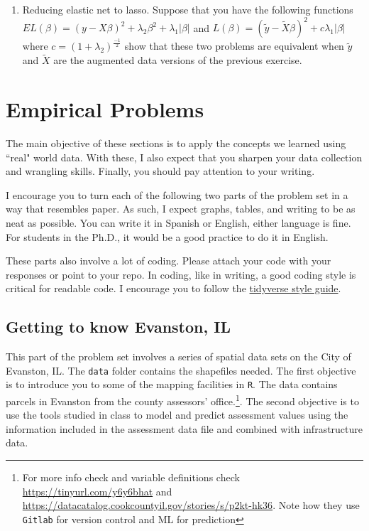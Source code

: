 \documentclass[12pt]{article}
\begin{document}
\begin{enumerate}
  \item Reducing elastic net to lasso. Suppose that you have the following functions $EL(\beta) = (y-X\beta)^2+ \lambda_2 \beta^2+ \lambda_1|\beta|$ and $L(\beta) = (\tilde{y}-\tilde{X}\beta)^2+ c \lambda_1|\beta|$ where $c=(1+\lambda_2)^{\frac{-1}{2}}$ show that these two problems are equivalent when $\tilde{y}$ and $\tilde{X}$ are the augmented data versions of the previous exercise.
\end{enumerate}

\section{Empirical Problems}

The main objective of these sections is to apply the concepts we learned using ``real" world data. With these, I also expect that you sharpen your data collection and wrangling skills. Finally, you should pay attention to your writing.

I encourage you to turn each of the following two parts of the problem set in a way that resembles paper. As such, I expect graphs, tables, and writing to be as neat as possible. You can write it in Spanish or English, either language is fine. For students in the Ph.D., it would be a good practice to do it in English.

These parts also involve a lot of coding. Please attach your code with your responses or point to your repo. In coding, like in writing, a good coding style is critical for readable code. I encourage you to follow the \href{https://style.tidyverse.org/}{tidyverse style guide}.


\subsection{Getting to know Evanston, IL}

This part of the problem set involves a series of spatial data sets on the City of Evanston, IL. The \texttt{data} folder contains the shapefiles needed. The first objective is to introduce you to some of the mapping facilities in \texttt{R}.  The data contains parcels in Evanston from the county assessors' office.\footnote{For more info check and variable definitions check \url{https://tinyurl.com/y6y6bhat} and \url{https://datacatalog.cookcountyil.gov/stories/s/p2kt-hk36}. Note how they use \texttt{Gitlab} for version control and ML for prediction}. The second objective is to use the tools studied in class to model and predict assessment values using the information included in the assessment data file and combined with infrastructure data.
\end{document}
